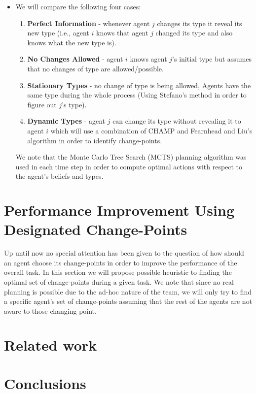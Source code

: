 \documentclass{article}
\begin{document}
\color{black}
\begin{itemize}
	\item We will compare the following four cases: 	\begin{enumerate}
		\item \textbf{Perfect Information} - whenever agent $j$ changes its type it reveal its new type (i.e., agent $i$ knows that agent $j$ changed its type and also knows what the new type is).
		\item \textbf{No Changes Allowed} - agent $i$ knows agent $j$'s initial type but assumes that no changes of type are allowed/possible.
		\item \textbf{Stationary Types} - no change of type is being allowed, Agents have the same type during the whole process (Using Stefano's method in order to figure out $j$'s type).
		\item \textbf{Dynamic Types} - agent $j$ can change its type without revealing it to agent $i$ which will use a combination of CHAMP and Fearnhead and Liu's algorithm in order to identify change-points.
	\end{enumerate}
	We note that the Monte Carlo Tree Search (MCTS) planning algorithm was used in each time step in order to compute optimal actions with respect to the agent's beliefs and types.
\end{itemize}

\section{Performance Improvement Using Designated Change-Points}
Up until now no special attention has been given to the question of how should an agent choose its change-points in order to improve the performance of the overall task. In this section we will propose possible heuristic to finding the optimal set of change-points during a given task. We note that since no real planning is possible due to the ad-hoc nature of the team, we will only try to find a specific agent's set of change-points assuming that the rest of the agents are not aware to those changing point.
\section{Related work}

\section{Conclusions}





%
  
\end{document}
